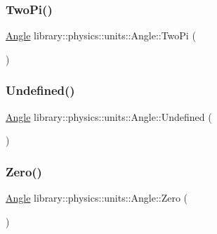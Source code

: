 \subsubsection{\texorpdfstring{Two\+Pi()}{TwoPi()}}
{\footnotesize\ttfamily \hyperlink{classlibrary_1_1physics_1_1units_1_1_angle}{Angle} library\+::physics\+::units\+::\+Angle\+::\+Two\+Pi (\begin{DoxyParamCaption}{ }\end{DoxyParamCaption})\hspace{0.3cm}{\ttfamily [static]}}

\mbox{\label{classlibrary_1_1physics_1_1units_1_1_angle_a9c9a16c58d7e1e95e38cf2adf888f334}} 
\subsubsection{\texorpdfstring{Undefined()}{Undefined()}}
{\footnotesize\ttfamily \hyperlink{classlibrary_1_1physics_1_1units_1_1_angle}{Angle} library\+::physics\+::units\+::\+Angle\+::\+Undefined (\begin{DoxyParamCaption}{ }\end{DoxyParamCaption})\hspace{0.3cm}{\ttfamily [static]}}

\mbox{\label{classlibrary_1_1physics_1_1units_1_1_angle_a3dcf6f9bcee4ae440d36859c30481d2b}} 
\subsubsection{\texorpdfstring{Zero()}{Zero()}}
{\footnotesize\ttfamily \hyperlink{classlibrary_1_1physics_1_1units_1_1_angle}{Angle} library\+::physics\+::units\+::\+Angle\+::\+Zero (\begin{DoxyParamCaption}{ }\end{DoxyParamCaption})\hspace{0.3cm}{\ttfamily [static]}}



